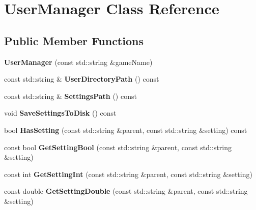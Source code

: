 \hypertarget{classUserManager}{}\section{User\+Manager Class Reference}
\label{classUserManager}
\subsection*{Public Member Functions}
\begin{DoxyCompactItemize}
\item 
\mbox{\label{classUserManager_a4012809c5b758af6f06599c640c19eed}} 
{\bfseries User\+Manager} (const std\+::string \&game\+Name)
\item 
\mbox{\label{classUserManager_aebf9bff259f323ca0884a951b2d17243}} 
const std\+::string \& {\bfseries User\+Directory\+Path} () const
\item 
\mbox{\label{classUserManager_aee712ac1c63ddee381aaea1ff3a0ddb5}} 
const std\+::string \& {\bfseries Settings\+Path} () const
\item 
\mbox{\label{classUserManager_ab8e8b56b8206056d469d77ef2c5789b0}} 
void {\bfseries Save\+Settings\+To\+Disk} () const
\item 
\mbox{\label{classUserManager_a8f90eeef9a967372a826fc9c4916e4ae}} 
bool {\bfseries Has\+Setting} (const std\+::string \&parent, const std\+::string \&setting) const
\item 
\mbox{\label{classUserManager_aa128549548274e7b19410485349c68a2}} 
const bool {\bfseries Get\+Setting\+Bool} (const std\+::string \&parent, const std\+::string \&setting)
\item 
\mbox{\label{classUserManager_a92c1aafeb9e0a393b6ed2bff57ef747f}} 
const int {\bfseries Get\+Setting\+Int} (const std\+::string \&parent, const std\+::string \&setting)
\item 
\mbox{\label{classUserManager_a799e3816a0b5b8782e60e9dbde388d6e}} 
const double {\bfseries Get\+Setting\+Double} (const std\+::string \&parent, const std\+::string \&setting)

\end{DoxyCompactItemize}
